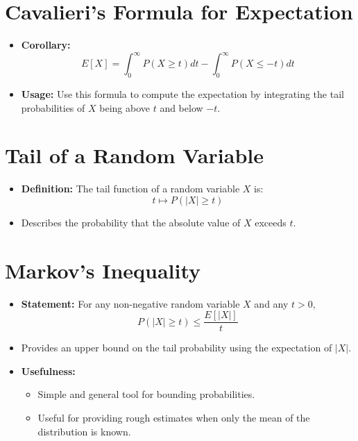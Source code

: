 \documentclass{article}
\begin{document}
\section*{Cavalieri's Formula for Expectation}
\begin{itemize}
    \item \textbf{Corollary:}
    \[
    E[X] = \int_0^{\infty} P(X \ge t) dt - \int_0^{\infty} P(X \le -t) dt
    \]
    \item \textbf{Usage:} Use this formula to compute the expectation by integrating the tail probabilities of $X$ being above $t$ and below $-t$.
\end{itemize}

\section*{Tail of a Random Variable}
\begin{itemize}
    \item \textbf{Definition:} The tail function of a random variable $X$ is:
    \[
    t \mapsto P(|X| \ge t)
    \]
    \item Describes the probability that the absolute value of $X$ exceeds $t$.
\end{itemize}

\section*{Markov's Inequality}
\begin{itemize}
    \item \textbf{Statement:} For any non-negative random variable $X$ and any $t > 0$,
    \[
    P(|X| \ge t) \le \frac{E[|X|]}{t}
    \]
    \item Provides an upper bound on the tail probability using the expectation of $|X|$.
    \item \textbf{Usefulness:}
    \begin{itemize}
        \item Simple and general tool for bounding probabilities.
        \item Useful for providing rough estimates when only the mean of the distribution is known.
    \end{itemize}
\end{itemize}
\end{document}
